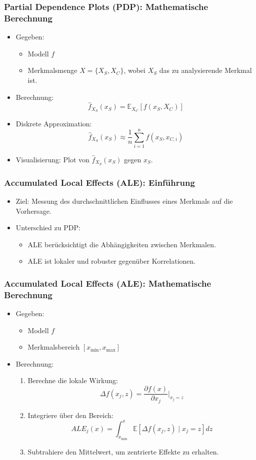\documentclass[aspectratio=1610, xcolor=dvipsnames, 9pt]{beamer}
\begin{document}
\begin{frame}
  \frametitle{Partial Dependence Plots (PDP): Mathematische Berechnung}
  \begin{itemize}
    \item Gegeben:
    \begin{itemize}
      \item Modell $f$
      \item Merkmalsmenge $X = \{X_S, X_C\}$, wobei $X_S$ das zu analysierende Merkmal ist.
    \end{itemize}
    \item Berechnung:
    \[
    \hat{f}_{X_S}(x_S) = \mathbb{E}_{X_C}[f(x_S, X_C)]
    \]
    \item Diskrete Approximation:
    \[
    \hat{f}_{X_S}(x_S) \approx \frac{1}{n} \sum_{i=1}^n f(x_S, x_{C,i})
    \]
    \item Visualisierung: Plot von $\hat{f}_{X_S}(x_S)$ gegen $x_S$.
  \end{itemize}
\end{frame}

\begin{frame}
  \frametitle{Accumulated Local Effects (ALE): Einführung}
  \begin{itemize}
    \item Ziel: Messung des durchschnittlichen Einflusses eines Merkmals auf die Vorhersage.
    \item Unterschied zu PDP:
    \begin{itemize}
      \item ALE berücksichtigt die Abhängigkeiten zwischen Merkmalen.
      \item ALE ist lokaler und robuster gegenüber Korrelationen.
    \end{itemize}
  \end{itemize}
\end{frame}

\begin{frame}
  \frametitle{Accumulated Local Effects (ALE): Mathematische Berechnung}
  \begin{itemize}
    \item Gegeben:
    \begin{itemize}
      \item Modell $f$
      \item Merkmalsbereich $[x_{\text{min}}, x_{\text{max}}]$
    \end{itemize}
    \item Berechnung:
    \begin{enumerate}
      \item Berechne die lokale Wirkung:
      \[
      \Delta f(x_j, z) = \frac{\partial f(x)}{\partial x_j} \bigg|_{x_j = z}
      \]
      \item Integriere über den Bereich:
      \[
      ALE_j(x) = \int_{x_{\text{min}}}^x \mathbb{E} \left[ \Delta f(x_j, z) \mid x_j = z \right] dz
      \]
      \item Subtrahiere den Mittelwert, um zentrierte Effekte zu erhalten.
    \end{enumerate}
  \end{itemize}
\end{frame}
\end{document}
